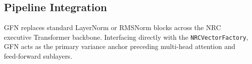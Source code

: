 \subsection{Pipeline Integration}
GFN replaces standard LayerNorm or RMSNorm blocks across the NRC executive Transformer backbone. Interfacing directly with the \texttt{NRCVectorFactory}, GFN acts as the primary variance anchor preceding multi-head attention and feed-forward sublayers.